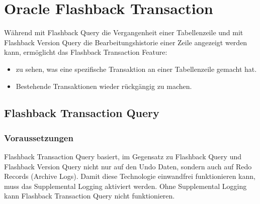     \section{Oracle Flashback Transaction}
      Während mit Flashback Query die Vergangenheit einer Tabellenzeile und mit Flashback Version Query die Bearbeitungshistorie einer Zeile angezeigt werden kann, ermöglicht das Flashback Transaction Feature:
        \begin{itemize}
          \item zu sehen, was eine spezifische Transaktion an einer Tabellenzeile gemacht hat.
          \item Bestehende Transaktionen wieder rückgängig zu machen.
        \end{itemize}
      \subsection{Flashback Transaction Query}
        \subsubsection{Voraussetzungen}
          Flashback Transaction Query basiert, im Gegensatz zu Flashback Query und Flashback Version Query nicht nur auf den Undo Daten, sondern auch auf Redo Records (Archive Logs). Damit diese Technologie einwandfrei funktionieren kann, muss das Supplemental Logging aktiviert werden. Ohne Supplemental Logging kann Flashback Transaction Query nicht funktionieren.
\clearpage
